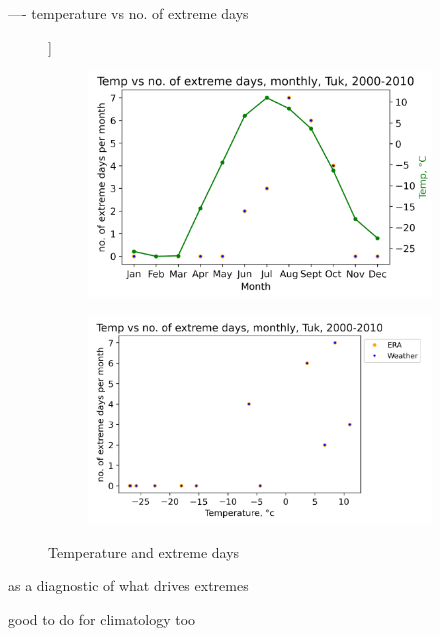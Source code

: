 \documentclass[draft]{agujournal2019}
\begin{document}
----
temperature vs no. of extreme days 

\begin{figure}[h!tbp]]
\centering
\begin{subfigure}[b]{0.55\textwidth}
   \includegraphics[width=1\linewidth]{figures/year_extreme_temp_precip_days_tuk_00_10.png}
   \caption{}
   \label{fig:Ng1} 
\end{subfigure}

\begin{subfigure}[b]{0.55\textwidth}
   \includegraphics[width=1\linewidth]{figures/temp_vs_no_extreme_days_tuk_00_10.png}
   \caption{}
   \label{fig:Ng2}
\end{subfigure}

\caption{Temperature and extreme days }
\end{figure}


as a diagnostic of what drives extremes 

good to do for climatology too 
\end{document}

